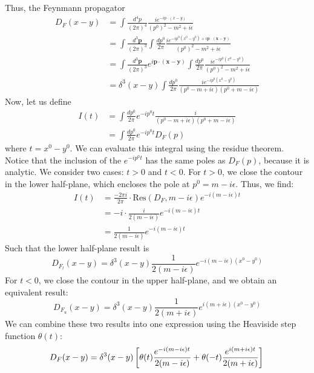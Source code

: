 \documentclass[12pt]{article}
\begin{document}
Thus, the Feynmann propagator
\begin{align*}
    D_F(x-y) &= \int \frac{d^4p}{(2\pi)^4} \frac{i e^{-ip\cdot(x-y)}}{(p^0)^2 - m^2
    + i\epsilon} \\
    &= \int \frac{d^3\mathbf{p}}{(2\pi)^3} \int \frac{dp^0}{2\pi} \frac{i
    e^{-ip^0(x^0 - y^0) + i\mathbf{p}\cdot(\mathbf{x}-\mathbf{y})}}{(p^0)^2 - m^2
    + i\epsilon} \\
    &= \int \frac{d^3\mathbf{p}}{(2\pi)^3}e^{i\mathbf{p}\cdot (\mathbf{x} - \mathbf{y})} \int \frac{dp^0}{2\pi} \frac{i
    e^{-ip^0(x^0 - y^0)}}{(p^0)^2 - m^2 + i\epsilon} \\
    &= \delta^3(x - y) \int \frac{dp^0}{2\pi} \frac{i
    e^{-ip^0(x^0 - y^0)}}{(p^0  - m + i\epsilon)(p^0 + m - i\epsilon)}
\end{align*}
Now, let us define 
\begin{align*}
    I(t) &= \int \frac{dp^0}{2\pi}e^{-ip^0 t} \frac{i}{(p^0  - m +
    i\epsilon)(p^0 + m - i\epsilon)}  \\
    &= \int \frac{dp^0}{2\pi} e^{-ip^0 t} D_F(p)
\end{align*}
where $t = x^0 - y^0$. We can evaluate this integral using the residue theorem.
Notice that the  inclusion of the $e^{-ip^0t}$ has  the same poles as
$D_F(p)$, because it is analytic. We consider two cases: $t>0$ and $t<0$. For
$t>0$, we close the contour in the lower half-plane, which encloses the pole at
$p^0 = m - i\epsilon$. Thus, we find:
\begin{align*}
    I(t) &= \frac{-2\pi i}{2\pi} \cdot \text{Res}(D_F, m - i\epsilon) e^{-i(m - i\epsilon)t} \\
    &= -i \cdot \frac{i}{2(m - i\epsilon)} e^{-i(m - i\epsilon)t} \\
    &= \frac{1}{2(m - i\epsilon)} e^{-i(m - i\epsilon)t}
\end{align*}
Such that the lower half-plane result is
\begin{equation*}
   D_{F_l}(x-y) = \delta^3(x-y) \frac{1}{2(m - i\epsilon)} e^{-i(m - i\epsilon)(x^0 - y^0)}
\end{equation*}
For $t<0$, we close the contour in the upper half-plane, and we obtain  an equivalent 
result:
\begin{equation*}
    D_{F_u}(x-y) = \delta^3(x-y) \frac{1}{2(m + i\epsilon)} e^{i(m + i\epsilon)(x^0 - y^0)}
\end{equation*}
We can combine these two results into one expression using the Heaviside step function
$\theta(t)$:
\begin{equation*}
    D_F(x-y) = \delta^3(x-y) \left[ \theta(t) \frac{e^{-i(m  - i\epsilon)t}}{2(m - i\epsilon)} 
    +  \theta(-t) \frac{e^{i(m + i\epsilon)t}}{2(m + i\epsilon)} \right] \\
\end{equation*}
\end{document}
